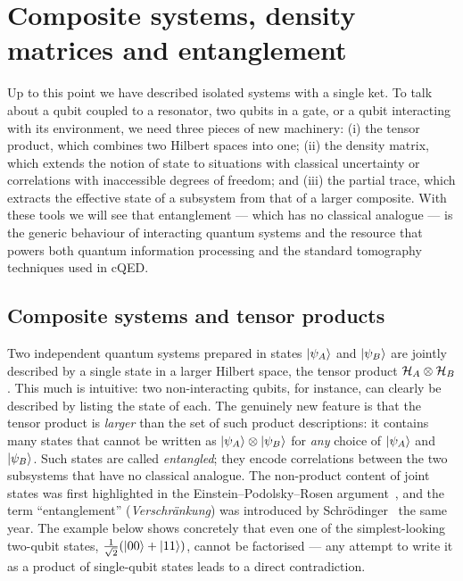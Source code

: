 \chapter{Composite systems, density matrices and entanglement}
\label{ch:composite}


Up to this point we have described isolated systems with a single
ket. To talk about a qubit coupled to a resonator, two qubits in a
gate, or a qubit interacting with its environment, we need three
pieces of new machinery: (i) the tensor product, which combines two
Hilbert spaces into one; (ii) the density matrix, which extends the
notion of state to situations with classical uncertainty or
correlations with inaccessible degrees of freedom; and (iii) the
partial trace, which extracts the effective state of a subsystem from
that of a larger composite. With these tools we will see that
entanglement --- which has no classical analogue --- is the generic
behaviour of interacting quantum systems and the resource that powers
both quantum information processing and the standard tomography
techniques used in cQED.

\section{Composite systems and tensor products}
\label{sec:tensor}

\begin{phenomenon}
Two independent quantum systems prepared in states $\ket{\psi_A}$
and $\ket{\psi_B}$ are jointly described by a single state in a
larger Hilbert space, the tensor product $\mathcal{H}_A\otimes\mathcal{H}_B$.
This much is intuitive: two non-interacting qubits, for instance,
can clearly be described by listing the state of each. The
genuinely new feature is that the tensor product is \emph{larger}
than the set of such product descriptions: it contains many states
that cannot be written as $\ket{\psi_A}\otimes\ket{\psi_B}$ for
\emph{any} choice of $\ket{\psi_A}$ and $\ket{\psi_B}$. Such states
are called \emph{entangled}; they encode correlations between the
two subsystems that have no classical analogue. The non-product
content of joint states was first highlighted in the
Einstein--Podolsky--Rosen argument~\cite{einstein1935}, and the
term ``entanglement'' (\emph{Verschr\"ankung}) was introduced by
Schr\"odinger~\cite{schrodinger1935} the same year. The example
below shows concretely that even one of the simplest-looking
two-qubit states, $\tfrac{1}{\sqrt 2}(\ket{00}+\ket{11})$, cannot
be factorised --- any attempt to write it as a product of
single-qubit states leads to a direct contradiction.
\end{phenomenon}

